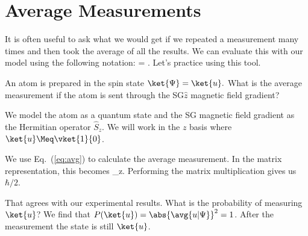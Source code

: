 \section{Average Measurements}
It is often useful to ask what we would get if we repeated a measurement many times and then took the average of all the results. We can evaluate this with our model using the following notation: 
\beq
{} = .
\label{eq:avg}
\eeq
Let's practice using this tool.
\begin{example}
An atom is prepared in the spin state $\ket{\Psi}=\ket{u}.$ What is the average measurement if the atom is sent through the SG$\hat{z}$ magnetic field gradient?

\model We model the atom as a quantum state and the SG magnetic field gradient as the Hermitian operator $\hat{S}_z$. We will work in the $z$ basis where $\ket{u} \Meq\vket{1}{0}$.

\vis
\begin{figure}
\centering
{}
\end{figure}

\sol We use Eq.~(\ref{eq:avg}) \marginnote{\ref{tool:avg}} to calculate the average measurement. In the matrix representation, this becomes
\beq
{}_z\Meq {}\szmatrix{}.
\eeq
Performing the matrix multiplication gives us $\hbar/2$. 

\assess That agrees with our experimental results. What is the probability of measuring $\ket{u}$? We find that $P(\ket{u}) = \abs{\avg{u|\Psi}}^2=1$. After the measurement the state is still $\ket{u}$.

\end{example}

